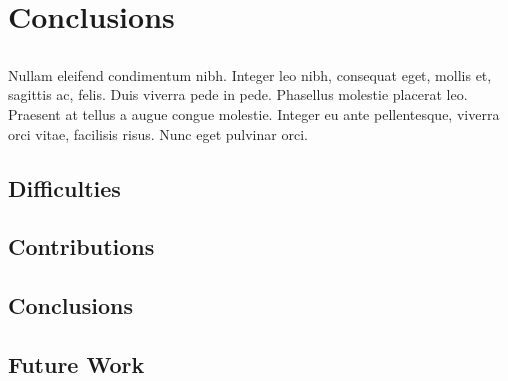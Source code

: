 \chapter{Conclusions} \label{chap:concl}

\section*{}

Nullam eleifend condimentum nibh. Integer leo nibh, consequat eget,
mollis et, sagittis ac, felis. Duis viverra pede in pede. Phasellus
molestie placerat leo. Praesent at tellus a augue congue molestie.
Integer eu ante pellentesque, viverra orci vitae, facilisis
risus. Nunc eget pulvinar orci.


\section{Difficulties}

\section{Contributions}

\section{Conclusions}

\section{Future Work}